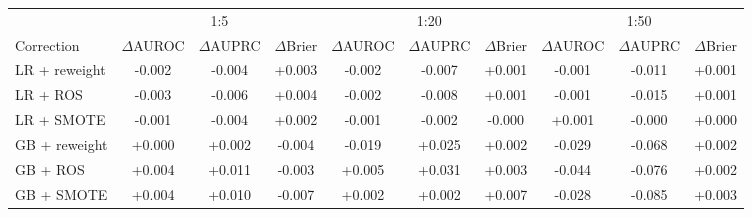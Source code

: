 \begin{tabular}{lccccccccc}
\toprule
 & \multicolumn{3}{c}{1:5} & \multicolumn{3}{c}{1:20} & \multicolumn{3}{c}{1:50} \\
Correction & $\Delta$AUROC & $\Delta$AUPRC & $\Delta$Brier & $\Delta$AUROC & $\Delta$AUPRC & $\Delta$Brier & $\Delta$AUROC & $\Delta$AUPRC & $\Delta$Brier \\
\midrule
LR + reweight & -0.002\rlap{$^{*}$} & -0.004\rlap{$^{*}$} & +0.003\rlap{$^{*}$} & -0.002 & -0.007 & +0.001 & -0.001 & -0.011 & +0.001 \\
LR + ROS & -0.003\rlap{$^{*}$} & -0.006\rlap{$^{*}$} & +0.004\rlap{$^{*}$} & -0.002 & -0.008 & +0.001 & -0.001 & -0.015 & +0.001 \\
LR + SMOTE & -0.001 & -0.004 & +0.002 & -0.001 & -0.002 & -0.000 & +0.001 & -0.000 & +0.000 \\
GB + reweight & +0.000 & +0.002 & -0.004 & -0.019 & +0.025 & +0.002 & -0.029 & -0.068 & +0.002 \\
GB + ROS & +0.004\rlap{$^{*}$} & +0.011\rlap{$^{*}$} & -0.003 & +0.005 & +0.031 & +0.003 & -0.044 & -0.076 & +0.002 \\
GB + SMOTE & +0.004 & +0.010 & -0.007 & +0.002 & +0.002 & +0.007 & -0.028 & -0.085 & +0.003 \\
\bottomrule
\end{tabular}